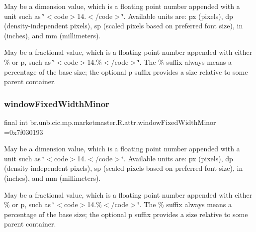 May be a dimension value, which is a floating point number appended with a unit such as \char`\"{}$<$code$>$14.\+5sp$<$/code$>$\char`\"{}. Available units are\+: px (pixels), dp (density-\/independent pixels), sp (scaled pixels based on preferred font size), in (inches), and mm (millimeters). 

May be a fractional value, which is a floating point number appended with either \% or p, such as \char`\"{}$<$code$>$14.\%$<$/code$>$\char`\"{}. The \% suffix always means a percentage of the base size; the optional p suffix provides a size relative to some parent container. \mbox{\label{classbr_1_1unb_1_1cic_1_1mp_1_1marketmaster_1_1R_1_1attr_a5510b93ddb7f73a1188b964d69beb3a0}} 
\subsubsection{\texorpdfstring{window\+Fixed\+Width\+Minor}{windowFixedWidthMinor}}
{\footnotesize\ttfamily final int br.\+unb.\+cic.\+mp.\+marketmaster.\+R.\+attr.\+window\+Fixed\+Width\+Minor =0x7f030193\hspace{0.3cm}{\ttfamily [static]}}

May be a dimension value, which is a floating point number appended with a unit such as \char`\"{}$<$code$>$14.\+5sp$<$/code$>$\char`\"{}. Available units are\+: px (pixels), dp (density-\/independent pixels), sp (scaled pixels based on preferred font size), in (inches), and mm (millimeters). 

May be a fractional value, which is a floating point number appended with either \% or p, such as \char`\"{}$<$code$>$14.\%$<$/code$>$\char`\"{}. The \% suffix always means a percentage of the base size; the optional p suffix provides a size relative to some parent container. \mbox{\label{classbr_1_1unb_1_1cic_1_1mp_1_1marketmaster_1_1R_1_1attr_afbc16aec3c1c9c3902471effcc75155e}} 
